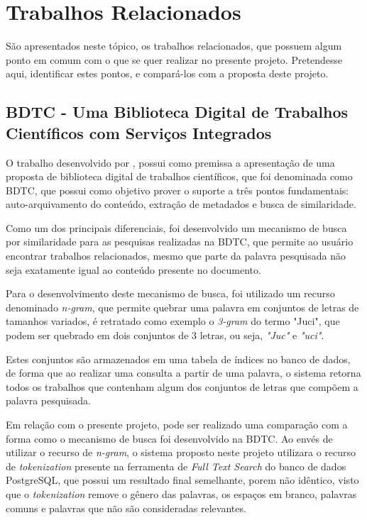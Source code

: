 \section{Trabalhos Relacionados}\label{sec:rw}

São apresentados neste tópico, os trabalhos relacionados, que possuem
algum ponto em comum com o que se quer realizar no presente projeto.
Pretendesse aqui, identificar estes pontos, e compará-los com a proposta deste projeto.

\subsection{BDTC - Uma Biblioteca Digital de Trabalhos Científicos com Serviços Integrados}

O trabalho desenvolvido por \cite{2009:Cervi}, possui como premissa a apresentação
de uma proposta de biblioteca digital de trabalhos científicos, que foi denominada como
BDTC, que possui como objetivo prover o suporte a três pontos fundamentais:
auto-arquivamento do conteúdo, extração de metadados e busca de similaridade.

Como um dos principais diferenciais, foi desenvolvido um mecanismo de
busca por similaridade para as pesquisas realizadas na BDTC,
que permite ao usuário encontrar trabalhos relacionados, mesmo que
parte da palavra pesquisada não seja exatamente igual ao conteúdo presente
no documento.

Para o desenvolvimento deste mecanismo de busca, foi utilizado
um recurso denominado \emph{n-gram}, que permite quebrar uma palavra em
conjuntos de letras de tamanhos variados, é retratado como exemplo o
\emph{3-gram} do termo "Juci", que podem ser quebrado em dois conjuntos de 3
letras, ou seja, \emph{"Juc"} e \emph{"uci"}.

Estes conjuntos são armazenados em uma tabela de índices no banco de
dados, de forma que ao realizar uma consulta a partir de uma palavra,
o sistema retorna todos os trabalhos que contenham algum dos conjuntos
de letras que compõem a palavra pesquisada.

Em relação com o presente projeto, pode ser realizado uma comparação com
a forma como o mecanismo de busca foi desenvolvido na BDTC. Ao envés de
utilizar o recurso de \emph{n-gram}, o sistema proposto neste projeto utilizara
o recurso de \emph{tokenization} presente na ferramenta de \emph{Full Text Search} do
banco de dados PostgreSQL, que possui um resultado final semelhante, porem não
idêntico, visto que o \emph{tokenization} remove o gênero das palavras,
os espaços em branco, palavras comuns e palavras que não são consideradas relevantes.

